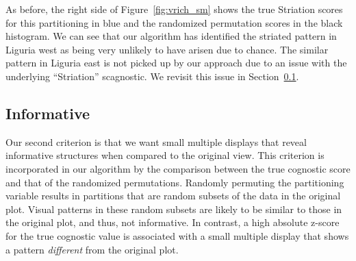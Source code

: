 As before, the right side of Figure~\ref{fig:vrich_sm} shows the true Striation scores for this partitioning in blue and the randomized permutation scores in the black histogram. We can see that our algorithm has identified the striated pattern in Liguria west as being very unlikely to have arisen due to chance. The similar pattern in Liguria east is not picked up by our approach due to an issue with the underlying ``Striation'' scagnostic. We revisit this issue in Section~\ref{}.

\subsection{Informative}
Our second criterion is that we want small multiple displays that reveal informative structures when compared to the original view. This criterion is incorporated in our algorithm by the comparison between the true cognostic score and that of the randomized permutations. Randomly permuting the partitioning variable results in partitions that are random subsets of the data in the original plot. Visual patterns in these random subsets are likely to be similar to those in the original plot, and thus, not informative. In contrast, a high absolute z-score for the true cognostic value is associated with a small multiple display that shows a pattern \emph{different} from the original plot.

